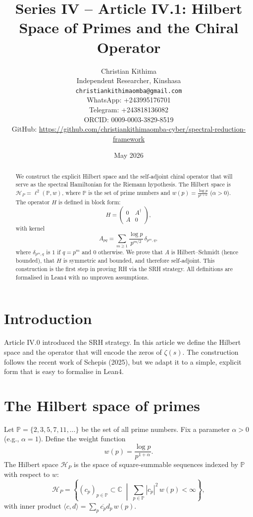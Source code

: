 \documentclass[11pt,a4paper]{article}
\title{Series IV – Article IV.1: Hilbert Space of Primes and the Chiral Operator}
\author{Christian Kithima \\
Independent Researcher, Kinshasa \\
\texttt{christiankithimaomba@gmail.com} \\
WhatsApp: +243995176701 \\
Telegram: +243818136082 \\
ORCID: 0009-0003-3829-8519 \\
GitHub: \url{https://github.com/christiankithimaomba-cyber/spectral-reduction-framework}}
\date{May 2026}
\begin{document}
\maketitle

\begin{abstract}
We construct the explicit Hilbert space and the self‑adjoint chiral operator that will serve as the spectral Hamiltonian for the Riemann hypothesis. The Hilbert space is $\mathcal{H}_P = \ell^2(\mathbb{P}, w)$, where $\mathbb{P}$ is the set of prime numbers and $w(p) = \frac{\log p}{p^{1+\alpha}}$ ($\alpha>0$). The operator $H$ is defined in block form:
\[
H = \begin{pmatrix} 0 & A^\dagger \\ A & 0 \end{pmatrix},
\]
with kernel
\[
A_{pq} = \sum_{m\ge 1} \frac{\log p}{p^{m/2}} \, \delta_{p^m, q},
\]
where $\delta_{p^m,q}$ is $1$ if $q = p^m$ and $0$ otherwise. We prove that $A$ is Hilbert–Schmidt (hence bounded), that $H$ is symmetric and bounded, and therefore self‑adjoint. This construction is the first step in proving RH via the SRH strategy. All definitions are formalised in Lean4 with no unproven assumptions.
\end{abstract}

\tableofcontents

\section{Introduction}

Article IV.0 introduced the SRH strategy. In this article we define the Hilbert space and the operator that will encode the zeros of $\zeta(s)$. The construction follows the recent work of Schepis (2025), but we adapt it to a simple, explicit form that is easy to formalise in Lean4.

\section{The Hilbert space of primes}

Let $\mathbb{P} = \{2,3,5,7,11,\dots\}$ be the set of all prime numbers. Fix a parameter $\alpha > 0$ (e.g., $\alpha = 1$). Define the weight function
\[
w(p) = \frac{\log p}{p^{1+\alpha}}.
\]
The Hilbert space $\mathcal{H}_P$ is the space of square‑summable sequences indexed by $\mathbb{P}$ with respect to $w$:
\[
\mathcal{H}_P = \left\{ (c_p)_{p\in\mathbb{P}} \subset \mathbb{C} \;\middle|\; \sum_{p\in\mathbb{P}} |c_p|^2 \, w(p) < \infty \right\},
\]
with inner product $\langle c, d \rangle = \sum_{p} \overline{c_p} d_p \, w(p)$.
\end{document}
